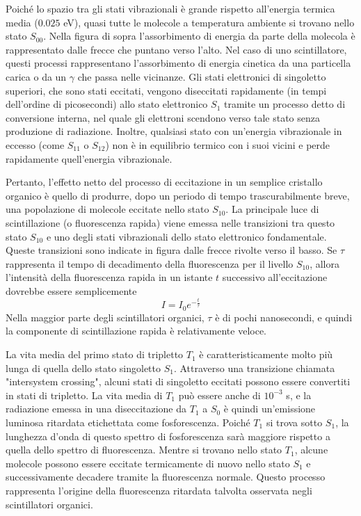 Poiché lo spazio tra gli stati vibrazionali è grande rispetto all'energia termica media ($0.025$ eV), quasi tutte le molecole a temperatura ambiente si trovano nello stato $S_{00}$. Nella figura di sopra l'assorbimento di energia da parte della molecola è rappresentato dalle frecce che puntano verso l'alto. Nel caso di uno scintillatore, questi processi rappresentano l'assorbimento di energia cinetica da una particella carica o da un $\gamma$ che passa nelle vicinanze. Gli stati elettronici di singoletto superiori, che sono stati eccitati, vengono diseccitati rapidamente (in tempi dell'ordine di picosecondi) allo stato elettronico $S_1$ tramite un processo detto di conversione interna, nel quale gli elettroni scendono verso tale stato senza produzione di radiazione. Inoltre, qualsiasi stato con un'energia vibrazionale in eccesso (come $S_{11}$ o $S_{12}$) non è in equilibrio termico con i suoi vicini e perde rapidamente quell'energia vibrazionale.

Pertanto, l'effetto netto del processo di eccitazione in un semplice cristallo organico è quello di produrre, dopo un periodo di tempo trascurabilmente breve, una popolazione di molecole eccitate nello stato $S_{10}$. La principale luce di scintillazione (o fluorescenza rapida) viene emessa nelle transizioni tra questo stato $S_{10}$ e uno degli stati vibrazionali dello stato elettronico fondamentale. Queste transizioni sono indicate in figura dalle frecce rivolte verso il basso. Se $\tau$ rappresenta il tempo di decadimento della fluorescenza per il livello $S_{10}$, allora l'intensità della fluorescenza rapida in un istante $t$ successivo all'eccitazione dovrebbe essere semplicemente
\begin{equation*}
   I=I_0 e^{-\frac{t}{\tau}}
\end{equation*}
Nella maggior parte degli scintillatori organici, $\tau$ è di pochi nanosecondi, e quindi la componente di scintillazione rapida è relativamente veloce.

La vita media del primo stato di tripletto $T_1$ è caratteristicamente molto più lunga di quella dello stato singoletto $S_1$. Attraverso una transizione chiamata "intersystem crossing", alcuni stati di singoletto eccitati possono essere convertiti in stati di tripletto. La vita media di $T_1$ può essere anche di $10^{-3}$ s, e la radiazione emessa in una diseccitazione da $T_1$ a $S_0$ è quindi un'emissione luminosa ritardata etichettata come fosforescenza. Poiché $T_1$ si trova sotto $S_1$, la lunghezza d'onda di questo spettro di fosforescenza sarà maggiore rispetto a quella dello spettro di fluorescenza. Mentre si trovano nello stato $T_1$, alcune molecole possono essere eccitate termicamente di nuovo nello stato $S_1$ e successivamente decadere tramite la fluorescenza normale. Questo processo rappresenta l'origine della fluorescenza ritardata talvolta osservata negli scintillatori organici.

